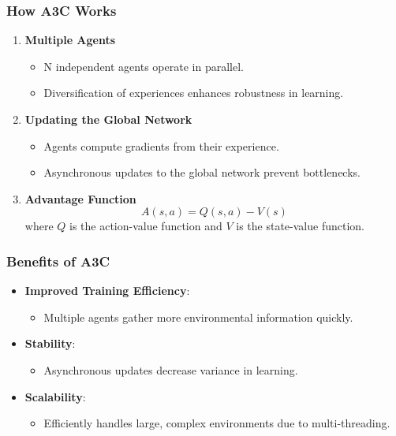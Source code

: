 \documentclass{beamer}
\begin{document}
\begin{frame}[fragile]
    \frametitle{How A3C Works}
    \begin{enumerate}
        \item \textbf{Multiple Agents}
            \begin{itemize}
                \item N independent agents operate in parallel.
                \item Diversification of experiences enhances robustness in learning.
            \end{itemize}
        \item \textbf{Updating the Global Network}
            \begin{itemize}
                \item Agents compute gradients from their experience.
                \item Asynchronous updates to the global network prevent bottlenecks.
            \end{itemize}
        \item \textbf{Advantage Function}
            \begin{equation}
                A(s, a) = Q(s, a) - V(s)
            \end{equation}
            where \(Q\) is the action-value function and \(V\) is the state-value function.
    \end{enumerate}
\end{frame}

\begin{frame}[fragile]
    \frametitle{Benefits of A3C}
    \begin{itemize}
        \item \textbf{Improved Training Efficiency}:
            \begin{itemize}
                \item Multiple agents gather more environmental information quickly.
            \end{itemize}
        \item \textbf{Stability}:
            \begin{itemize}
                \item Asynchronous updates decrease variance in learning.
            \end{itemize}
        \item \textbf{Scalability}:
            \begin{itemize}
                \item Efficiently handles large, complex environments due to multi-threading.
            \end{itemize}
    \end{itemize}
\end{frame}
\end{document}
